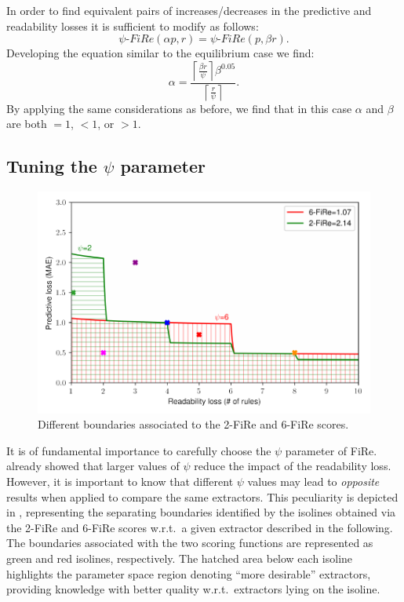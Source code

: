 \documentclass{article}
\newcommand{\fire}{FiRe}
\begin{document}
In order to find equivalent pairs of increases/decreases in the predictive and readability losses it is sufficient to modify  as follows:
%
\begin{equation}\label{eq:equi3}
	\psi\textrm{-}\fire(\alpha p, r) = \psi\textrm{-}\fire(p, \beta r).
\end{equation}
%
Developing the equation similar to the equilibrium case we find:
%
\begin{equation}\label{eq:alpha}
	\alpha = \frac{\left \lceil{\frac{\beta r}{\psi}}\right \rceil \beta^{0.05}}{\left \lceil{\frac{r}{\psi}}\right \rceil}.
\end{equation}
%
By applying the same considerations as before, we find that in this case $\alpha$ and $\beta$ are both $=1$, $<1$, or $>1$.

\subsection{Tuning the $\psi$ parameter}\label{ssec:psi}

\begin{figure}
	\centering
	\includegraphics[width=\linewidth]{figures/areas.pdf}
	\caption{Different boundaries associated to the 2-\fire{} and 6-\fire{} scores.}\label{fig:areas}
\end{figure}

It is of fundamental importance to carefully choose the $\psi$ parameter of \fire{}.
%
 already showed that larger values of $\psi$ reduce the impact of the readability loss.
%
However, it is important to know that different $\psi$ values may lead to \emph{opposite} results when applied to compare the same extractors.
%
This peculiarity is depicted in , representing the separating boundaries identified by the isolines obtained via the 2-\fire{} and 6-\fire{} scores w.r.t.\ a given extractor described in the following.
%
The boundaries associated with the two scoring functions are represented as green and red isolines, respectively.
%
The hatched area below each isoline highlights the parameter space region denoting ``more desirable'' extractors, providing knowledge with better quality w.r.t.\ extractors lying on the isoline.
\end{document}
